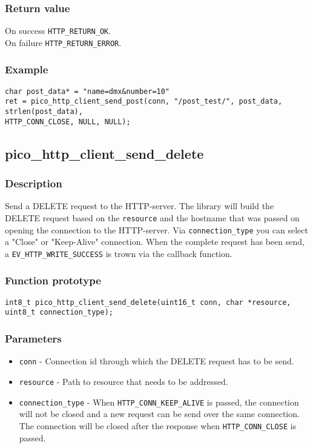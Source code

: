 \subsubsection*{Return value}
On success \texttt{HTTP\_RETURN\_OK}.
\\On failure \texttt{HTTP\_RETURN\_ERROR}.
\subsubsection*{Example}
\begin{verbatim}
char post_data* = "name=dmx&number=10"
ret = pico_http_client_send_post(conn, "/post_test/", post_data, strlen(post_data),
HTTP_CONN_CLOSE, NULL, NULL);
\end{verbatim}


\subsection{pico\_http\_client\_send\_delete}

\subsubsection*{Description}
Send a DELETE request to the HTTP-server. The library will build the DELETE request based on the \texttt{resource} and the hostname that was passed on opening the connection to the HTTP-server. Via \texttt{connection\_type} you can select a "Close" or "Keep-Alive" connection. When the complete request has been send, a \texttt{EV\_HTTP\_WRITE\_SUCCESS} is trown via the callback function.

\subsubsection*{Function prototype}
\texttt{int8\_t pico\_http\_client\_send\_delete(uint16\_t conn, char *resource, uint8\_t connection\_type);}

\subsubsection*{Parameters}
\begin{itemize}[noitemsep]
\item \texttt{conn} - Connection id through which the DELETE request has to be send.
\item \texttt{resource} - Path to resource that needs to be addressed.
\item \texttt{connection\_type} - When \texttt{HTTP\_CONN\_KEEP\_ALIVE} is passed, the connection will not be closed and a new request can be send over the same connection. The connection will be closed after the response when \texttt{HTTP\_CONN\_CLOSE} is passed.
\end{itemize}
